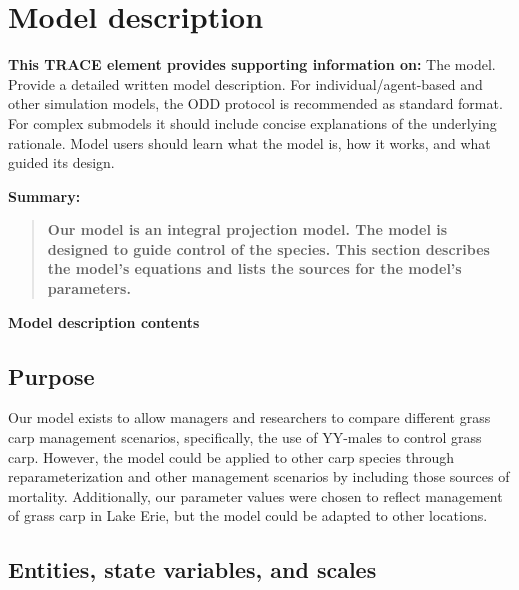 \documentclass{article}[12pt]
\begin{document}


\section{Model description}\label{sec:md}
\textbf{This TRACE element provides supporting information on:} The model. Provide a detailed written model description. For individual/agent-based and other simulation models, the ODD protocol is recommended as standard format. For complex submodels it should include concise explanations of the underlying rationale. Model users should learn what the model is, how it works, and what guided its design.


\textbf{Summary:}
\begin{verse}
\textbf{
Our model is an integral projection model.
The model is designed to guide control of the species.
This section describes the model's equations and lists the sources for the model's parameters.
}
\end{verse}


 \textbf{Model description  contents}
\startcontents[sections]



\subsection{Purpose}

Our model exists to allow managers and researchers to compare different grass carp management scenarios, specifically, the use of YY-males to control grass carp.
However, the model could be applied to other carp species through reparameterization and other management scenarios by including those sources of mortality. 
Additionally, our parameter values were chosen to reflect management of grass carp in Lake Erie, but the model could be adapted to other locations.

\subsection{Entities, state variables, and scales}
\end{document}
